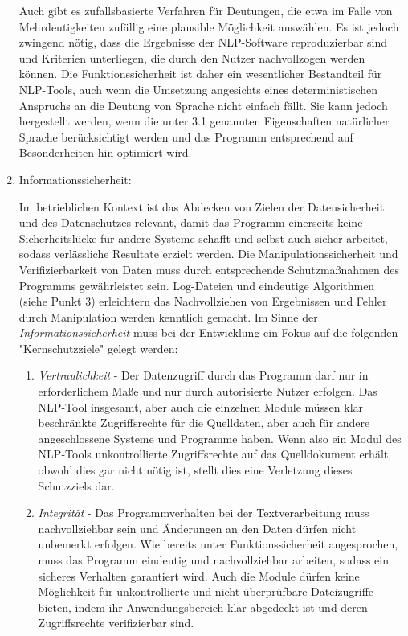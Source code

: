 \documentclass[12pt]{report}
\begin{document}
\begin{enumerate}
Auch gibt es zufallsbasierte Verfahren für Deutungen, die etwa im Falle von Mehrdeutigkeiten zufällig eine plausible Möglichkeit auswählen. Es ist jedoch zwingend nötig, dass die Ergebnisse der NLP-Software reproduzierbar sind und Kriterien unterliegen, die durch den Nutzer nachvollzogen werden können. Die Funktionssicherheit ist daher ein wesentlicher Bestandteil für NLP-Tools, auch wenn die Umsetzung angesichts eines deterministischen Anspruchs an die Deutung von Sprache nicht einfach fällt. Sie kann jedoch hergestellt werden, wenn die unter 3.1 genannten Eigenschaften natürlicher Sprache berücksichtigt werden und das Programm entsprechend auf Besonderheiten hin optimiert wird.

\item Informationssicherheit:

Im betrieblichen Kontext ist das Abdecken von Zielen der Datensicherheit und des Datenschutzes relevant, damit das Programm einerseits keine Sicherheitslücke für andere Systeme schafft und selbst auch sicher arbeitet, sodass verlässliche Resultate erzielt werden. Die Manipulationssicherheit und Verifizierbarkeit von Daten muss durch entsprechende Schutzmaßnahmen des Programms gewährleistet sein. Log-Dateien und eindeutige Algorithmen (siehe Punkt 3) erleichtern das Nachvollziehen von Ergebnissen und Fehler durch Manipulation werden kenntlich gemacht. Im Sinne der \textit{Informationssicherheit} \cite{eck13} muss bei der Entwicklung ein Fokus auf die folgenden "Kernschutzziele" gelegt werden:
\begin{enumerate}
\item \textit{Vertraulichkeit} - Der Datenzugriff durch das Programm darf nur in erforderlichem Maße und nur durch autorisierte Nutzer erfolgen. Das NLP-Tool insgesamt, aber auch die einzelnen Module müssen klar beschränkte Zugriffsrechte für die Quelldaten, aber auch für andere angeschlossene Systeme und Programme haben. Wenn also ein Modul des NLP-Tools unkontrollierte Zugriffsrechte auf das Quelldokument erhält, obwohl dies gar nicht nötig ist, stellt dies eine Verletzung dieses Schutzziels dar. 
\item \textit{Integrität} - Das Programmverhalten bei der Textverarbeitung muss nachvollziehbar sein und Änderungen an den Daten dürfen nicht unbemerkt erfolgen. Wie bereits unter Funktionssicherheit angesprochen, muss das Programm eindeutig und nachvollziehbar arbeiten, sodass ein sicheres Verhalten garantiert wird. Auch die Module dürfen keine Möglichkeit für unkontrollierte und nicht überprüfbare Dateizugriffe bieten, indem ihr Anwendungsbereich klar abgedeckt ist und deren Zugriffsrechte verifizierbar sind.

\end{enumerate}
\end{enumerate}
\end{document}
